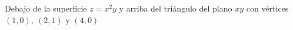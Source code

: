 \item Debajo de la superficie $z = x^2y$ y arriba del triángulo del plano $xy$ con vértices $(1, 0), \ (2, 1)$ y $(4, 0)$
